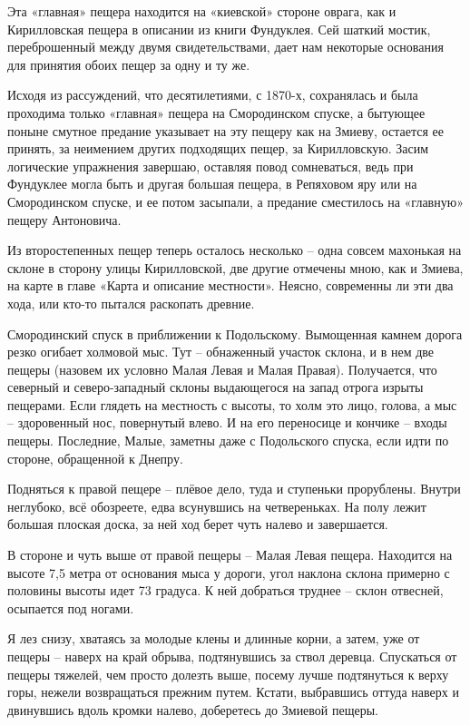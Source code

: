 Эта «главная» пещера находится на «киевской» стороне оврага, как и Кирилловская пещера в описании из книги Фундуклея. Сей шаткий мостик, переброшенный между двумя свидетельствами, дает нам некоторые основания для принятия обоих пещер за одну и ту же.

Исходя из рассуждений, что десятилетиями, с 1870-х, сохранялась и была проходима только «главная» пещера на Смородинском спуске, а бытующее поныне смутное предание указывает на эту пещеру как на Змиеву, остается ее принять, за неимением других подходящих пещер, за Кирилловскую. Засим логические упражнения завершаю, оставляя повод сомневаться, ведь при Фундуклее могла быть и другая большая пещера, в Репяховом яру или на Смородинском спуске, и ее потом засыпали, а предание сместилось на «главную» пещеру Антоновича.

Из второстепенных пещер теперь осталось несколько – одна совсем махонькая на склоне в сторону улицы Кирилловской, две другие отмечены мною, как и Змиева, на карте в главе «Карта и описание местности». Неясно, современны ли эти два хода, или кто-то пытался раскопать древние.

Смородинский спуск в приближении к Подольскому. Вымощенная камнем дорога резко огибает холмовой мыс. Тут – обнаженный участок склона, и в нем две пещеры (назовем их условно Малая Левая и Малая Правая). Получается, что северный и северо-западный склоны выдающегося на запад отрога изрыты пещерами. Если глядеть на местность с высоты, то холм это лицо, голова, а мыс – здоровенный нос, повернутый влево. И на его переносице и кончике – входы пещеры. Последние, Малые, заметны даже с Подольского спуска, если идти по стороне, обращенной к Днепру.
 
Подняться к правой пещере – плёвое дело, туда и ступеньки прорублены. Внутри неглубоко, всё обозреете, едва всунувшись на четвереньках. На полу лежит большая плоская доска, за ней ход берет чуть налево и завершается.

В стороне и чуть выше от правой пещеры – Малая Левая пещера. Находится на высоте 7,5 метра от основания мыса у дороги, угол наклона склона примерно с половины высоты идет 73 градуса. К ней добраться труднее – склон отвесней, осыпается под ногами. 

Я лез снизу, хватаясь за молодые клены и длинные корни, а затем, уже от пещеры – наверх на край обрыва, подтянувшись за ствол деревца. Спускаться от пещеры тяжелей, чем просто долезть выше, посему лучше подтянуться к верху горы, нежели возвращаться прежним путем. Кстати, выбравшись оттуда наверх и двинувшись вдоль кромки налево, доберетесь до Змиевой пещеры.

